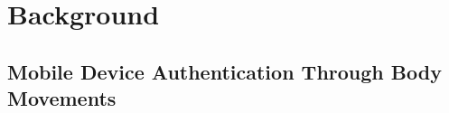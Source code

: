 \section{Background}
\label{sec:background}

\subsection{Mobile Device Authentication Through Body Movements}






